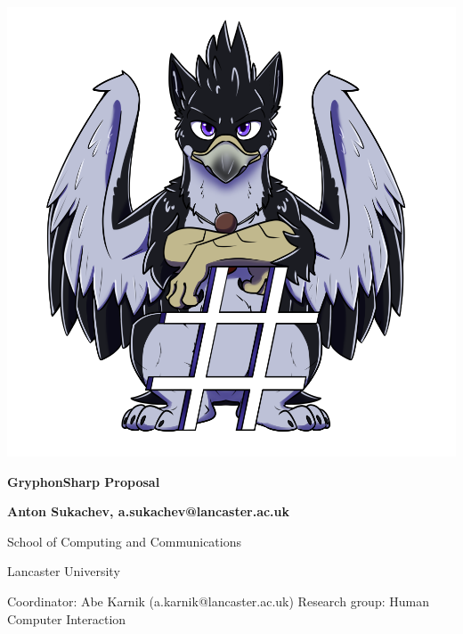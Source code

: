 \documentclass{article}
\begin{document}
\begin{titlepage}

    \center
    
    \includegraphics[scale=0.5]{AzuGryphonSharp.png} %
    
    \huge  \textbf{GryphonSharp Proposal}
    
    \vspace{2cm}
    
    \Large \textbf{Anton Sukachev, a.sukachev@lancaster.ac.uk}
    
    School of Computing and Communications
    
    Lancaster University
    
    \vfill
    
    Coordinator: Abe Karnik (a.karnik@lancaster.ac.uk)\endgraf
    Research group: Human Computer Interaction
    
    \end{titlepage}
\pagebreak
\end{document}
